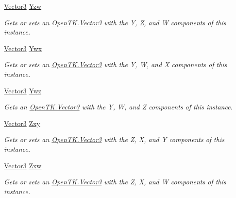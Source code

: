 \begin{DoxyCompactItemize}
\hyperlink{struct_open_t_k_1_1_vector3}{Vector3} \hyperlink{struct_open_t_k_1_1_vector4_a71bbd7c966a9f3fb8fc2792170d82ba8}{Yzw}
\begin{DoxyCompactList}\small\item\em Gets or sets an \hyperlink{struct_open_t_k_1_1_vector3}{Open\-T\-K.\-Vector3} with the Y, Z, and W components of this instance. \end{DoxyCompactList}\item 
\hyperlink{struct_open_t_k_1_1_vector3}{Vector3} \hyperlink{struct_open_t_k_1_1_vector4_a6105915c93f198ff7bfd42f30bd9c535}{Ywx}
\begin{DoxyCompactList}\small\item\em Gets or sets an \hyperlink{struct_open_t_k_1_1_vector3}{Open\-T\-K.\-Vector3} with the Y, W, and X components of this instance. \end{DoxyCompactList}\item 
\hyperlink{struct_open_t_k_1_1_vector3}{Vector3} \hyperlink{struct_open_t_k_1_1_vector4_aca49c9d39e463c4b3aa4c02d3498489a}{Ywz}
\begin{DoxyCompactList}\small\item\em Gets an \hyperlink{struct_open_t_k_1_1_vector3}{Open\-T\-K.\-Vector3} with the Y, W, and Z components of this instance. \end{DoxyCompactList}\item 
\hyperlink{struct_open_t_k_1_1_vector3}{Vector3} \hyperlink{struct_open_t_k_1_1_vector4_ad0184a7b31236c5c35d11151f41de82d}{Zxy}
\begin{DoxyCompactList}\small\item\em Gets or sets an \hyperlink{struct_open_t_k_1_1_vector3}{Open\-T\-K.\-Vector3} with the Z, X, and Y components of this instance. \end{DoxyCompactList}\item 
\hyperlink{struct_open_t_k_1_1_vector3}{Vector3} \hyperlink{struct_open_t_k_1_1_vector4_a1e8fe7f52610bb9ff43d9532334e10ca}{Zxw}
\begin{DoxyCompactList}\small\item\em Gets or sets an \hyperlink{struct_open_t_k_1_1_vector3}{Open\-T\-K.\-Vector3} with the Z, X, and W components of this instance. \end{DoxyCompactList}\item 

\end{DoxyCompactItemize}
